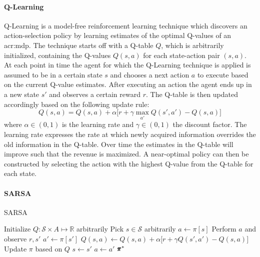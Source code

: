 \paragraph{Q-Learning}
\label{sec:q-learning}

Q-Learning \cite{dayan1992q, sutton1998reinforcement} is a model-free reinforcement learning technique which discovers an action-selection policy by learning estimates of the optimal Q-values of an \acrshort{acr:mdp}.
The technique starts off with a Q-table $Q$, which is arbitrarily initialized, containing the Q-values $Q(s,a)$ for each state-action pair $(s,a)$.
At each point in time the agent for which the Q-Learning technique is applied is assumed to be in a certain state $s$ and chooses a next action $a$ to execute based on the current Q-value estimates.
After executing an action the agent ends up in a new state $s'$ and observes a certain reward $r$.
The Q-table is then updated accordingly based on the following update rule:
\[
Q(s, a) = Q(s, a) + \alpha \Big[r + \gamma \max_{a'} Q(s',a') - Q(s, a)\Big]
\]
where $\alpha \in (0,1)$ is the learning rate and $\gamma \in (0, 1)$ the discount factor.
The learning rate expresses the rate at which newly acquired information overrides the old information in the Q-table.
Over time the estimates in the Q-table will improve such that the revenue is maximized.
A near-optimal policy can then be constructed by selecting the action with the highest Q-value from the Q-table for each state.

% 

\paragraph{SARSA}
\label{sec:sarsa}

\begin{algorithm}[!t]
	\caption{SARSA}
	\label{alg:sarsa}
	\begin{algorithmic}[1]
		\State Initialize $Q: \mathcal{S} \times A \mapsto \mathbb{R}$ arbitrarily
		\Repeat
		\State Pick $s \in \mathcal{S}$ arbitrarily
		\State $a \gets \pi[s]$ 
		\Repeat
		\State Perform $a$ and observe $r, s'$
		\State $a' \gets \pi[s']$
		\State $Q(s,a) \gets Q(s,a) + \alpha \Big[r + \gamma Q(s', a') - Q(s, a)\Big]$
		\State Update $\pi$ based on $Q$
		\State $s \gets s'$
		\State $a \gets a'$
		\State\Return $\pmb{\pi}^*$
	\end{algorithmic}
\end{algorithm}

